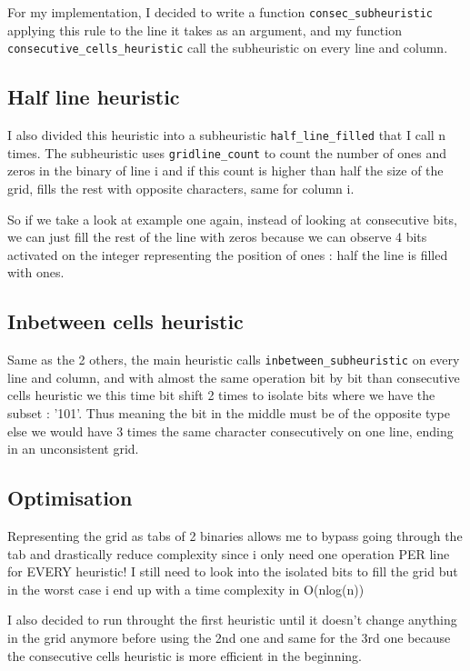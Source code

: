 \documentclass{article}
\begin{document}
For my implementation, I decided to write a function \texttt{consec\_subheuristic} applying this rule to the line it takes as an argument, and my function \texttt{consecutive\_cells\_heuristic} call the subheuristic on every line and column.

\subsection{Half line heuristic}

I also divided this heuristic into a subheuristic \texttt{half\_line\_filled} that I call n times. The subheuristic uses \texttt{gridline\_count} to count the number of ones and zeros in the binary of line i and if this count is higher than half the size of the grid, fills the rest with opposite characters, same for column i. 

So if we take a look at example one again, instead of looking at consecutive bits, we can just fill the rest of the line with zeros because we can observe 4 bits activated on the integer representing the position of ones : half the line is filled with ones.

\subsection{Inbetween cells heuristic}

Same as the 2 others, the main heuristic calls \texttt{inbetween\_subheuristic} on every line and column, and with almost the same operation bit by bit than consecutive cells heuristic we this time bit shift 2 times to isolate bits where we have the subset : '101'. Thus meaning the bit in the middle must be of the opposite type else we would have 3 times the same character consecutively on one line, ending in an unconsistent grid.

\subsection{Optimisation}

Representing the grid as tabs of 2 binaries allows me to bypass going through the tab and drastically reduce complexity since i only need one operation PER line for EVERY heuristic! I still need to look into the isolated bits to fill the grid but in the worst case i end up with a time complexity in O(nlog(n))

I also decided to run throught the first heuristic until it doesn't change anything in the grid anymore before using the 2nd one and same for the 3rd one because the consecutive cells heuristic is more efficient in the beginning.
\end{document}
